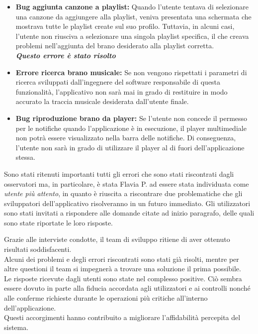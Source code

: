 \documentclass{article}
\begin{document}
		\begin{itemize}
			\item \textbf{Bug aggiunta canzone a playlist:} 
			Quando l'utente tentava di selezionare una canzone da aggiungere alla playlist, veniva presentata una schermata che mostrava tutte le playlist create sul suo profilo. Tuttavia, in alcuni casi, l'utente non riusciva a selezionare una singola playlist specifica, il che creava problemi nell'aggiunta del brano desiderato alla playlist corretta.\\
			\textit{\textbf{Questo errore è stato risolto}}
			
			\item \textbf{Errore ricerca brano musicale:}
			Se non vengono rispettati i parametri di ricerca sviluppati dall'ingegnere del software responsabile di questa funzionalità, l'applicativo non sarà mai in grado di restituire in modo accurato la traccia musicale desiderata dall'utente finale.
			\item \textbf{Bug riproduzione brano da player:}
			Se l'utente non concede il permesso per le notifiche quando l'applicazione è in esecuzione, il player multimediale non potrà essere visualizzato nella barra delle notifiche. Di conseguenza, l'utente non sarà in grado di utilizzare il player al di fuori dell'applicazione stessa.
		\end{itemize}
		Sono stati ritenuti importanti tutti gli errori che sono stati riscontrati dagli osservatori ma, in particolare, è stata Flavia P. ad essere stata individuata come \textit{utente più attento}, in quanto è riuscita a riscontrare due problematiche che gli sviluppatori dell'applicativo risolveranno in un futuro immediato.
		Gli utilizzatori sono stati invitati a rispondere alle domande citate ad inizio paragrafo, delle quali sono state riportate le loro risposte.
		
		Grazie alle interviste condotte, il team di sviluppo ritiene di aver ottenuto risultati soddisfacenti. 
		\\Alcuni dei problemi e degli errori riscontrati sono stati già risolti, mentre per altre questioni il team si impegnerà a trovare una soluzione il prima possibile.\\
		
		Le risposte ricevute dagli utenti sono state nel complesso positive. Ciò sembra essere dovuto in parte alla fiducia accordata agli utilizzatori e ai controlli nonché alle conferme richieste durante le operazioni più critiche all'interno dell'applicazione. 
		\\Questi accorgimenti hanno contribuito a migliorare l'affidabilità percepita del sistema.
\end{document}
